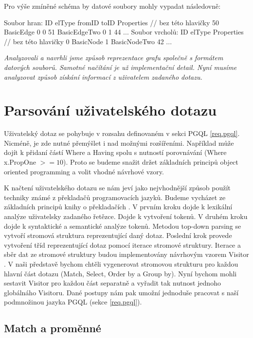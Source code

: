 Pro výše zmíněné schéma by datové soubory mohly vypadat následovně:
\begin{code}
Soubor hran:
ID elType fromID toID Properties // bez této hlavičky
50 BasicEdge 0 0 
51 BasicEdgeTwo 0 1 44
...
Soubor vrcholů:
ID elType Properties // bez této hlavičky
0 BasicNode
1 BasicNodeTwo 42
...
\end{code}

\bigskip
\textit{Analyzovali a navrhli jsme způsob reprezentace grafu společně s formátem datových souborů.
Samotné načítání je už implementační detail.
Nyní musíme analyzovat způsob získání informací z uživatelem zadaného dotazu. }

\section{Parsování uživatelského dotazu}

Uživatelský dotaz se pohybuje v rozsahu definovaném v sekci PGQL \ref{req.pgql}.
Nicméně, je zde nutné přemýšlet i nad možnými rozšířeními.
Například může dojít k přidaní částí Where a Having spolu s nutností porovnávání (Where x.PropOne $>= 10$).
Proto se budeme snažit držet základních principů object oriented programming a volit vhodné návrhové vzory.

K načtení uživatelského dotazu se nám jeví jako nejvhodnější způsob použít techniky známé z překladačů programovacích jazyků.
Budeme vycházet ze základních principů knihy o překladačích \citep{dragoonBook}.
V prvním kroku dojde k lexikální analýze uživatelsky zadaného řetězce.
Dojde k vytvoření tokenů.
V druhém kroku dojde k syntaktické a semantické analýze tokenů.
Metodou top-down parsing \citep[str. 217]{dragoonBook} se vytvoří stromová struktura reprezentující daný dotaz.
Poslední krok provede vytvoření tříd reprezentující dotaz pomocí iterace stromové struktury.
Iterace a sběr dat ze stromové struktury budou implementovány návrhovým vzorem Visitor \citep[str. 331]{patterns}.
V naši představě bychom chtěli vygenerovat stromovou strukturu pro každou hlavní část dotazu (Match, Select, Order by a Group by).
Nyní bychom mohli sestavit Visitor pro každou část separatně a vyřadit tak nutnost jednoho globálnáho Visitoru.
Dané postupy nám pak umožní jednoduše pracovat s naší podmnožinou jazyka PGQL (sekce \ref{req.pgql}).


\subsection{Match a proměnné} \label{anal.mathcandvar}

